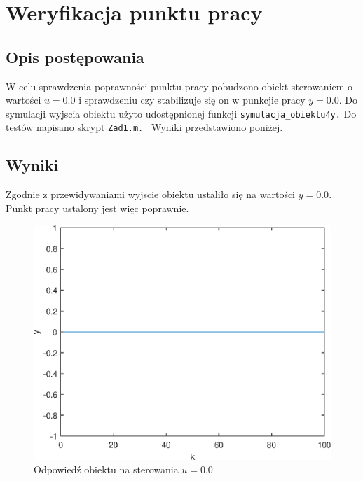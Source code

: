 \chapter{Weryfikacja punktu pracy}
\label{zad1}

\section{Opis postępowania}
\label{zad1_opis}
W celu sprawdzenia poprawności punktu pracy pobudzono obiekt sterowaniem
o wartości $u = \num{0.0}$ i sprawdzeniu czy stabilizuje się on w punkcjie pracy  $y = \num{0.0}$. Do symulacji wyjscia obiektu użyto udostępnionej funkcji 
\verb+symulacja_obiektu4y.+ Do testów napisano skrypt \verb+Zad1.m. + Wyniki przedstawiono poniżej.

\section{Wyniki}
\label{zad1_wyniki}
Zgodnie z przewidywaniami wyjscie obiektu ustaliło się na wartości $y= \num{0.0}$. Punkt pracy ustalony jest więc poprawnie.
\begin{figure}[tb]
	\centering
	\includegraphics[scale=1]{Rys/punkt_pracy.eps}
	\caption{Odpowiedź obiektu na sterowania $u=\num{0.0}$}
\end{figure}
